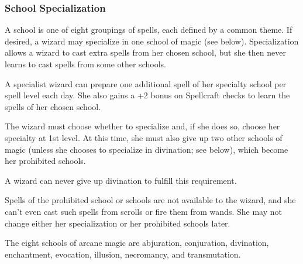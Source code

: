
\subsubsection{School Specialization}

\smallskip\noindent A school is one of eight groupings of spells, each defined by a common theme. If desired, a wizard may specialize in one school of magic (see below). Specialization allows a wizard to cast extra spells from her chosen school, but she then never learns to cast spells from some other schools.

\smallskip\noindent A specialist wizard can prepare one additional spell of her specialty school per spell level each day. She also gains a +2 bonus on Spellcraft checks to learn the spells of her chosen school.

\smallskip\noindent The wizard must choose whether to specialize and, if she does so, choose her specialty at 1st level. At this time, she must also give up two other schools of magic (unless she chooses to specialize in divination; see below), which become her prohibited schools.

\smallskip\noindent A wizard can never give up divination to fulfill this requirement.

\smallskip\noindent Spells of the prohibited school or schools are not available to the wizard, and she can't even cast such spells from scrolls or fire them from wands. She may not change either her specialization or her prohibited schools later.

\smallskip\noindent The eight schools of arcane magic are abjuration, conjuration, divination, enchantment, evocation, illusion, necromancy, and transmutation.

